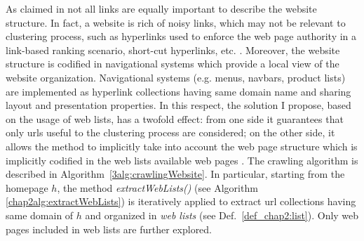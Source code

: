 As claimed in \cite{Crescenzi:2005} not all links are equally important to describe the website structure. In fact, a website is rich of noisy links, which may not be relevant to clustering process, such as hyperlinks used to enforce the web page authority in a link-based ranking scenario, short-cut hyperlinks, etc. . Moreover, the website structure is codified in navigational systems which provide a local  view  of  the  website organization. Navigational systems (e.g. menus, navbars, product lists) are implemented as hyperlink collections having same domain name and sharing layout and presentation properties.
In this respect, the solution I propose, based on the usage of web lists, has a twofold effect: from one side it guarantees that only urls useful to the clustering process are considered; on the other side, it allows the method to implicitly take into account the web page structure which is implicitly codified in the web lists available web pages \cite{Crescenzi:2005, Qi:2006, Weninger:2013, Lanotte:2014}. 
\color{red}
\color{black}
The crawling algorithm is described in Algorithm~\ref{3alg:crawlingWebsite}.
In particular, starting from the homepage $h$, the method \textit{extractWebLists()} (see Algorithm \ref{chap2alg:extractWebLists}) is iteratively applied to extract url collections having same domain of $h$ and organized in \emph{web lists} (see Def.~\ref{def_chap2:list}). Only web pages included in web lists are further explored. 

